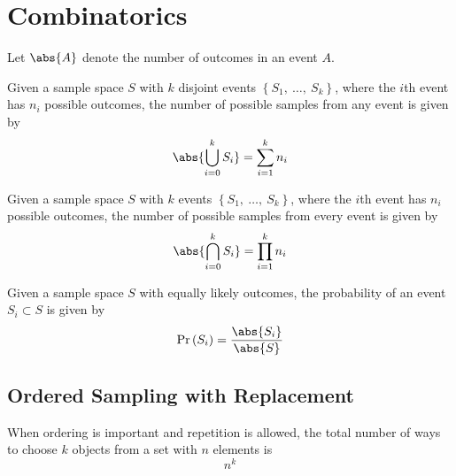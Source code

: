 \documentclass{article}
\begin{document}
\section{Combinatorics}
\begin{definition}
    Let \(\abs{A}\) denote the number of outcomes in an event \(A\).
\end{definition}
\begin{theorem}
    Given a sample space \(S\) with \(k\) disjoint events \({\left\{ S_1,\:\ldots,\:S_k \right\}}\),
    where the \(i\)th event has \(n_i\) possible outcomes,
    the number of possible samples from any event is given by
    \begin{equation*}
        \abs{\bigcup_{i = 0}^{k} S_i} = \sum_{i = 1}^k n_i
    \end{equation*}
\end{theorem}
\begin{theorem}
    Given a sample space \(S\) with \(k\) events \({\left\{ S_1,\:\ldots,\:S_k \right\}}\),
    where the \(i\)th event has \(n_i\) possible outcomes,
    the number of possible samples from every event is given by
    \begin{equation*}
        \abs{\bigcap_{i=0}^{k} S_i} = \prod_{i = 1}^k n_i
    \end{equation*}
\end{theorem}
\begin{theorem}
    Given a sample space \(S\) with equally likely outcomes, the probability
    of an event \(S_i \subset S\) is given by
    \begin{equation*}
        \Pr{\left( S_i \right)} = \frac{\abs{S_i}}{\abs{S}}
    \end{equation*}
\end{theorem}
\subsection{Ordered Sampling with Replacement}
When ordering is important and repetition is allowed,
the total number of ways to choose \(k\) objects from a set with \(n\) elements is
\begin{equation*}
    n^k
\end{equation*}
\end{document}
